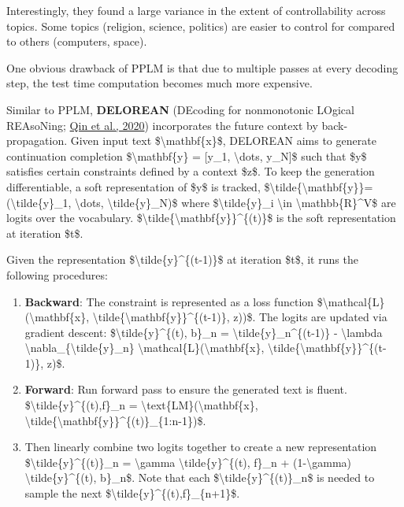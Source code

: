 Interestingly, they found a large variance in the extent of controllability across topics. Some topics (religion, science, politics) are easier to control for compared to others (computers, space).

One obvious drawback of PPLM is that due to multiple passes at every decoding step, the test time computation becomes much more expensive.

Similar to PPLM, \textbf{DELOREAN} (DEcoding for nonmonotonic LOgical REAsoNing; \href{https://arxiv.org/abs/2010.05906}{Qin et al., 2020}) incorporates the future context by back-propagation. Given input text \$\textbackslash mathbf\{x\}\$, DELOREAN aims to generate continuation completion \$\textbackslash mathbf\{y\} = {[}y\_1, \textbackslash dots, y\_N{]}\$ such that \$y\$ satisfies certain constraints defined by a context \$z\$. To keep the generation differentiable, a soft representation of \$y\$ is tracked, \$\textbackslash tilde\{\textbackslash mathbf\{y\}\}=(\textbackslash tilde\{y\}\_1, \textbackslash dots, \textbackslash tilde\{y\}\_N)\$ where \$\textbackslash tilde\{y\}\_i \textbackslash in \textbackslash mathbb\{R\}\^{}V\$ are logits over the vocabulary. \$\textbackslash tilde\{\textbackslash mathbf\{y\}\}\^{}\{(t)\}\$ is the soft representation at iteration \$t\$.

Given the representation \$\textbackslash tilde\{y\}\^{}\{(t-1)\}\$ at iteration \$t\$, it runs the following procedures:

\begin{enumerate}
\tightlist
\item
  \textbf{Backward}: The constraint is represented as a loss function \$\textbackslash mathcal\{L\}(\textbackslash mathbf\{x\}, \textbackslash tilde\{\textbackslash mathbf\{y\}\}\^{}\{(t-1)\}, z))\$. The logits are updated via gradient descent: \$\textbackslash tilde\{y\}\^{}\{(t), b\}\_n = \textbackslash tilde\{y\}\_n\^{}\{(t-1)\} - \textbackslash lambda \textbackslash nabla\_\{\textbackslash tilde\{y\}\_n\} \textbackslash mathcal\{L\}(\textbackslash mathbf\{x\}, \textbackslash tilde\{\textbackslash mathbf\{y\}\}\^{}\{(t-1)\}, z)\$.
\item
  \textbf{Forward}: Run forward pass to ensure the generated text is fluent. \$\textbackslash tilde\{y\}\^{}\{(t),f\}\_n = \textbackslash text\{LM\}(\textbackslash mathbf\{x\}, \textbackslash tilde\{\textbackslash mathbf\{y\}\}\^{}\{(t)\}\_\{1:n-1\})\$.
\item
  Then linearly combine two logits together to create a new representation \$\textbackslash tilde\{y\}\^{}\{(t)\}\_n = \textbackslash gamma \textbackslash tilde\{y\}\^{}\{(t), f\}\_n + (1-\textbackslash gamma) \textbackslash tilde\{y\}\^{}\{(t), b\}\_n\$. Note that each \$\textbackslash tilde\{y\}\^{}\{(t)\}\_n\$ is needed to sample the next \$\textbackslash tilde\{y\}\^{}\{(t),f\}\_\{n+1\}\$.
\end{enumerate}

